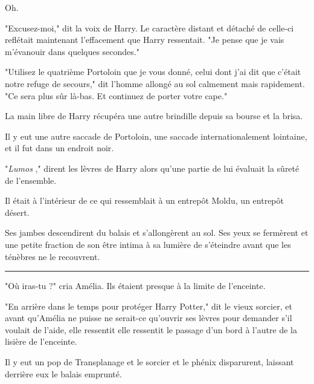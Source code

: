 Oh.

"Excusez-moi," dit la voix de Harry. Le caractère distant et détaché de celle-ci reflétait maintenant l'effacement que Harry ressentait. "Je pense que je vais m'évanouir dans quelques secondes."

"Utilisez le quatrième Portoloin que je vous donné, celui dont j'ai dit que c'était notre refuge de secours," dit l'homme allongé au sol calmement mais rapidement. "Ce sera plus sûr là-bas. Et continuez de porter votre cape."

La main libre de Harry récupéra une autre brindille depuis sa bourse et la brisa.

Il y eut une autre saccade de Portoloin, une saccade internationalement lointaine, et il fut dans un endroit noir.

"\emph{Lumos} ," dirent les lèvres de Harry alors qu'une partie de lui évaluait la sûreté de l'ensemble.

Il était à l'intérieur de ce qui ressemblait à un entrepôt Moldu, un entrepôt désert.

Ses jambes descendirent du balais et s'allongèrent au sol. Ses yeux se fermèrent et une petite fraction de son être intima à sa lumière de s'éteindre avant que les ténèbres ne le recouvrent.
\par\noindent\rule{\textwidth}{0.4pt}
"Où iras-tu ?" cria Amélia. Ils étaient presque à la limite de l'enceinte.

"En arrière dans le temps pour protéger Harry Potter," dit le vieux sorcier, et avant qu'Amélia ne puisse ne serait-ce qu'ouvrir ses lèvres pour demander s'il voulait de l'aide, elle ressentit elle ressentit le passage d'un bord à l'autre de la lisière de l'enceinte.

Il y eut un pop de Transplanage et le sorcier et le phénix disparurent, laissant derrière eux le balais emprunté.

